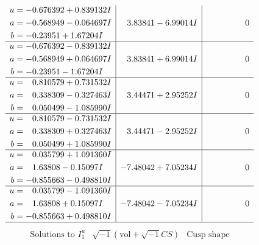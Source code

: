 \documentclass[1p]{elsarticle_modified}
\theoremstyle{definition}
\newcommand{\I}{\sqrt{-1}}
\begin{document}
$$\begin{array}{c|c|c}
\begin{aligned}
u &= -0.676392 + 0.839132 I \\
a &= -0.568949 - 0.064697 I \\
b &= -0.23951 + 1.67204 I\end{aligned}
 & \phantom{-}3.83841 - 6.99014 I & \phantom{-0.000000 } 0 \\ \hline\begin{aligned}
u &= -0.676392 - 0.839132 I \\
a &= -0.568949 + 0.064697 I \\
b &= -0.23951 - 1.67204 I\end{aligned}
 & \phantom{-}3.83841 + 6.99014 I & \phantom{-0.000000 } 0 \\ \hline\begin{aligned}
u &= \phantom{-}0.810579 + 0.731532 I \\
a &= \phantom{-}0.338309 - 0.327463 I \\
b &= \phantom{-}0.050499 - 1.085990 I\end{aligned}
 & \phantom{-}3.44471 + 2.95252 I & \phantom{-0.000000 } 0 \\ \hline\begin{aligned}
u &= \phantom{-}0.810579 - 0.731532 I \\
a &= \phantom{-}0.338309 + 0.327463 I \\
b &= \phantom{-}0.050499 + 1.085990 I\end{aligned}
 & \phantom{-}3.44471 - 2.95252 I & \phantom{-0.000000 } 0 \\ \hline\begin{aligned}
u &= \phantom{-}0.035799 + 1.091360 I \\
a &= \phantom{-}1.63808 - 0.15097 I \\
b &= -0.855663 - 0.498810 I\end{aligned}
 & -7.48042 + 7.05234 I & \phantom{-0.000000 } 0 \\ \hline\begin{aligned}
u &= \phantom{-}0.035799 - 1.091360 I \\
a &= \phantom{-}1.63808 + 0.15097 I \\
b &= -0.855663 + 0.498810 I\end{aligned}
 & -7.48042 - 7.05234 I & \phantom{-0.000000 } 0\\
 \hline 
 \end{array}$$\newpage$$\begin{array}{c|c|c}  
\text{Solutions to }I^u_{1}& \I (\text{vol} + \sqrt{-1}CS) & \text{Cusp shape}\\
 \hline 
\begin{aligned}

\end{aligned}
\end{array}$$
\end{document}
